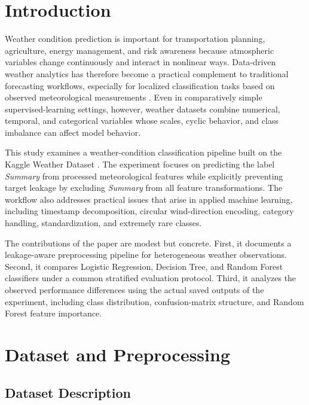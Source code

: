 \documentclass[10pt,letterpaper,twocolumn]{article}
\begin{document}
\section{Introduction}

Weather condition prediction is important for transportation planning, agriculture, energy management, and risk awareness because atmospheric variables change continuously and interact in nonlinear ways. Data-driven weather analytics has therefore become a practical complement to traditional forecasting workflows, especially for localized classification tasks based on observed meteorological measurements \cite{zhang2025survey, chen2023survey}. Even in comparatively simple supervised-learning settings, however, weather datasets combine numerical, temporal, and categorical variables whose scales, cyclic behavior, and class imbalance can affect model behavior.

This study examines a weather-condition classification pipeline built on the Kaggle Weather Dataset \cite{kaggleweather}. The experiment focuses on predicting the label \textit{Summary} from processed meteorological features while explicitly preventing target leakage by excluding \textit{Summary} from all feature transformations. The workflow also addresses practical issues that arise in applied machine learning, including timestamp decomposition, circular wind-direction encoding, category handling, standardization, and extremely rare classes.

The contributions of the paper are modest but concrete. First, it documents a leakage-aware preprocessing pipeline for heterogeneous weather observations. Second, it compares Logistic Regression, Decision Tree, and Random Forest classifiers under a common stratified evaluation protocol. Third, it analyzes the observed performance differences using the actual saved outputs of the experiment, including class distribution, confusion-matrix structure, and Random Forest feature importance.

\section{Dataset and Preprocessing}

\subsection{Dataset Description}
\end{document}
